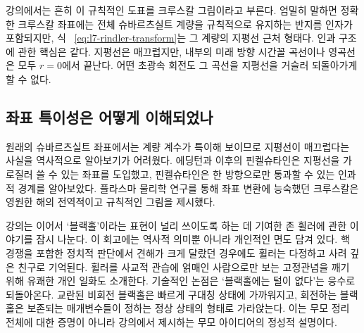 \begin{classroomqa}
\end{classroomqa}

\begin{classroomqa}
\end{classroomqa}

강의에서는 흔히 이 규칙적인 도표를 크루스칼 그림이라고 부른다. 엄밀히 말하면 정확한 크루스칼 좌표에는 전체 슈바르츠실트 계량을 규칙적으로 유지하는 반지름 인자가 포함되지만, 식 ~\eqref{eq:l7-rindler-transform}는 그 계량의 지평선 근처 형태다. 인과 구조에 관한 핵심은 같다. 지평선은 매끄럽지만, 내부의 미래 방향 시간꼴 곡선이나 영곡선은 모두 \(r=0\)에서 끝난다. 어떤 초광속 회전도 그 곡선을 지평선을 거슬러 되돌아가게 할 수 없다.

\subsection{좌표 특이성은 어떻게 이해되었나}

원래의 슈바르츠실트 좌표에서는 계량 계수가 특이해 보이므로 지평선이 매끄럽다는 사실을 역사적으로 알아보기가 어려웠다. 에딩턴과 이후의 핀켈슈타인은 지평선을 가로질러 쓸 수 있는 좌표를 도입했고, 핀켈슈타인은 한 방향으로만 통과할 수 있는 인과적 경계를 알아보았다. 플라스마 물리학 연구를 통해 좌표 변환에 능숙했던 크루스칼은 영원한 해의 전역적이고 규칙적인 그림을 제시했다.

강의는 이어서 ‘블랙홀’이라는 표현이 널리 쓰이도록 하는 데 기여한 존 휠러에 관한 이야기를 잠시 나눈다. 이 회고에는 역사적 의미뿐 아니라 개인적인 면도 담겨 있다. 핵 경쟁을 포함한 정치적 판단에서 견해가 크게 달랐던 경우에도 휠러는 다정하고 사려 깊은 친구로 기억된다. 휠러를 사교적 관습에 얽매인 사람으로만 보는 고정관념을 깨기 위해 유쾌한 개인 일화도 소개한다. 기술적인 논점은 ‘블랙홀에는 털이 없다’는 응수로 되돌아온다. 교란된 비회전 블랙홀은 빠르게 구대칭 상태에 가까워지고, 회전하는 블랙홀은 보존되는 매개변수들이 정하는 정상 상태의 형태로 가라앉는다. 이는 무모 정리 전체에 대한 증명이 아니라 강의에서 제시하는 무모 아이디어의 정성적 설명이다.

